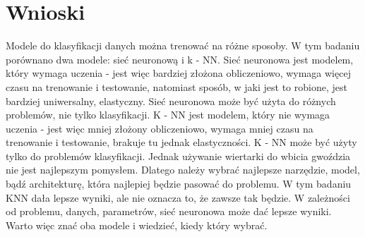 \section{Wnioski}\label{sec:wnioski}
Modele do klasyfikacji danych można trenować na różne sposoby. W tym badaniu porównano dwa modele: sieć neuronową i k - NN.
Sieć neuronowa jest modelem, który wymaga uczenia - jest więc bardziej złożona obliczeniowo, wymaga więcej czasu na trenowanie i testowanie,
natomiast sposób, w jaki jest to robione, jest bardziej uniwersalny, elastyczny. Sieć neuronowa może być użyta do różnych problemów, nie tylko klasyfikacji.
K - NN jest modelem, który nie wymaga uczenia - jest więc mniej złożony obliczeniowo, wymaga mniej czasu na trenowanie i testowanie,
brakuje tu jednak elastyczności. K - NN może być użyty tylko do problemów klasyfikacji. Jednak używanie wiertarki do wbicia gwoździa nie jest najlepszym pomysłem.
Dlatego należy wybrać najlepsze narzędzie, model, bądź architekturę, która najlepiej będzie pasować do problemu.
W tym badaniu KNN dała lepsze wyniki, ale nie oznacza to, że zawsze tak będzie. W zależności od problemu,
danych, parametrów, sieć neuronowa może dać lepsze wyniki. Warto więc znać oba modele i wiedzieć, kiedy który wybrać.